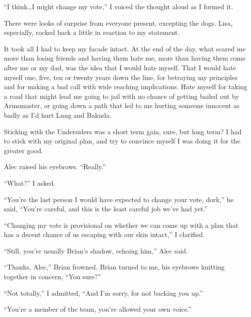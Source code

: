 ``I think\ldots I might change my vote,'' I voiced the thought aloud as I formed it.



There were looks of surprise from everyone present, excepting the dogs.  Lisa, especially, rocked back a little in reaction to my statement.



It took all I had to keep my facade intact.  At the end of the day, what scared me more than losing friends and having them hate me, more than having them come after me or my dad, was the idea that I would hate myself.  That I would hate myself one, five, ten or twenty years down the line, for betraying my principles and for making a bad call with wide reaching implications.  Hate myself for taking a road that might lead me going to jail with no chance of getting bailed out by Armsmaster, or going down a path that led to me hurting someone innocent as badly as I'd hurt Lung and Bakuda.



Sticking with the Undersiders was a short term gain, sure, but long term?  I had to stick with my original plan, and try to convince myself I was doing it for the greater good.



Alec raised his eyebrows.  ``Really.''



``What?'' I asked.



``You're the last person I would have expected to change your vote, dork,'' he said, ``You're careful, and this is the least careful job we've had yet.''



``Changing my vote is provisional on whether we can come up with a plan that has a decent chance of us escaping with our skin intact,'' I clarified.



``Still, you're usually Brian's shadow, echoing him,'' Alec said.



``Thanks, Alec,'' Brian frowned.  Brian turned to me, his eyebrows knitting together in concern, ``You sure?''



``Not totally,'' I admitted, ``And I'm sorry, for not backing you up.''



``You're a member of the team, you're allowed your own voice.''



